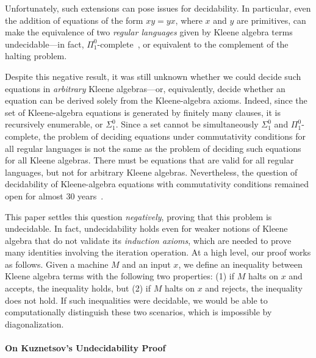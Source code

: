 \documentclass[a4paper,UKenglish,cleveref, autoref, thm-restate]{lipics-v2021}
\begin{document}
Unfortunately, such extensions can pose issues for decidability.  In particular,
even the addition of equations of the form $xy = yx$, where $x$ and $y$ are
primitives, can make the equivalence of two \emph{regular languages} given by
Kleene algebra terms~\cite{Kozen_1996,gibbons_DecidabilityProblemsRational_1986,berstel_TransductionsContextFreeLanguages_1979} undecidable---in fact,
$\Pi _1^0$-complete~\cite{DBLP:conf/lics/Kozen97}, or equivalent to the
complement of the halting problem.

Despite this negative result, it was still unknown whether we could decide such
equations in \emph{arbitrary} Kleene algebras---or, equivalently, decide whether
an equation can be derived solely from the Kleene-algebra axioms.  Indeed, since
the set of Kleene-algebra equations is generated by finitely many clauses, it is
recursively enumerable, or $ \Sigma _1^0$.  Since a set cannot be simultaneously
$ \Sigma _1^0$ and $ \Pi _1^0$-complete, the problem of deciding equations under
commutativity conditions for all regular languages is not the same as the
problem of deciding such equations for all Kleene algebras.  There must be
equations that are valid for all regular languages, but not for arbitrary Kleene
algebras.  Nevertheless, the question of decidability of Kleene-algebra
equations with commutativity conditions remained open for almost 30
years~\cite{DBLP:conf/lics/Kozen97}.

This paper settles this question \emph{negatively}, proving that this problem is
undecidable.  In fact, undecidability holds even for weaker notions of Kleene
algebra that do not validate its \emph{induction axioms}, which are needed to
prove many identities involving the iteration operation. At a high level, our
proof works as follows.  Given a machine $M$ and an input $x$, we define an
inequality between Kleene algebra terms with the following two properties: (1)
if $M$ halts on $x$ and accepts, the inequality holds, but (2) if $M$ halts on
$x$ and rejects, the inequality does not hold.  If such inequalities were
decidable, we would be able to computationally distinguish these two scenarios,
which is impossible by diagonalization.

\paragraph*{On Kuznetsov's Undecidability Proof}
\end{document}
